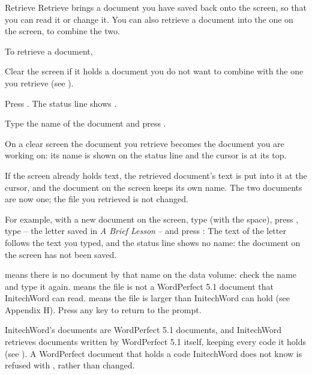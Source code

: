 \begin{Feature}{Retrieve}
Retrieve brings a document you have saved back onto the screen, so that you
can read it or change it.  You can also
retrieve a document into the one on the screen, to combine the two.

To retrieve a document,
\begin{WPSteps}
\item Clear the screen if it holds a document you do not want to combine
with the one you retrieve (see ).
\item Press .  The status line shows
.
\item Type the name of the document and press .
\end{WPSteps}
On a clear screen the document you retrieve becomes the document you are
working on: its name is shown on the status line and the cursor is at its
top.

\Notes
{}
If the screen already holds text, the retrieved document's text is put into
it at the cursor, and the document on the screen keeps its own name.  The
two documents are now one; the file you retrieved is not changed.

For example, with a new document on the screen, type
 (with the space), press
, type  -- the letter saved in
\textit{A Brief Lesson} -- and press :
\EndReplay
The text of the letter follows the text you typed, and the status line shows
no name: the document on the screen has not been saved.

 means there is no document by that name on the
data volume: check the name and type it again.
 means the file is not a WordPerfect
5.1 document that InitechWord can read.
 means the file is larger than InitechWord
can hold (see Appendix H).  Press any key to return to the prompt.

InitechWord's documents are WordPerfect 5.1 documents, and InitechWord
retrieves documents written by WordPerfect 5.1 itself, keeping every code
it holds (see ).  A WordPerfect document that holds a code
InitechWord does not know is refused with , rather than changed.

\end{Feature}

